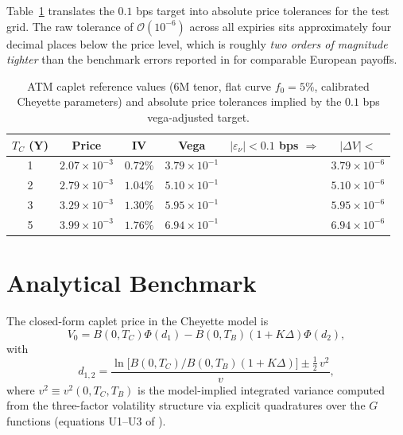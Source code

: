 \documentclass[11pt,a4paper]{article}
\begin{document}
Table~\ref{tab:budget} translates the $0.1$ bps target into absolute price
tolerances for the test grid. The raw tolerance of $\mathcal{O}(10^{-6})$
across all expiries sits approximately four decimal places below the price
level, which is roughly \emph{two orders of magnitude tighter} than the
benchmark errors reported in \cite{HJE2018} for comparable European payoffs.

\begin{table}[h]
\centering
\begin{tabular}{cccccc}
\toprule
$T_C$ (Y) & Price & IV & Vega & $|\varepsilon_\nu| < 0.1$ bps $\Rightarrow$ & $|\Delta V| <$ \\
\midrule
1 & $2.07 \times 10^{-3}$ & $0.72\%$ & $3.79 \times 10^{-1}$ & & $3.79 \times 10^{-6}$ \\
2 & $2.79 \times 10^{-3}$ & $1.04\%$ & $5.10 \times 10^{-1}$ & & $5.10 \times 10^{-6}$ \\
3 & $3.29 \times 10^{-3}$ & $1.30\%$ & $5.95 \times 10^{-1}$ & & $5.95 \times 10^{-6}$ \\
5 & $3.99 \times 10^{-3}$ & $1.76\%$ & $6.94 \times 10^{-1}$ & & $6.94 \times 10^{-6}$ \\
\bottomrule
\end{tabular}
\caption{ATM caplet reference values (6M tenor, flat curve $f_0 = 5\%$,
calibrated Cheyette parameters) and absolute price tolerances implied by the
$0.1$ bps vega-adjusted target.}
\label{tab:budget}
\end{table}

\section{Analytical Benchmark}
\label{sec:analytical}

The closed-form caplet price in the Cheyette model \cite{BCK2012} is
\begin{equation}
  V_0 = B(0, T_C)\Phi(d_1) - B(0, T_B)(1 + K\Delta)\Phi(d_2),
  \label{eq:analytical}
\end{equation}
with
\begin{equation}
  d_{1,2} = \frac{\ln\!\bigl[B(0,T_C) / B(0,T_B)(1+K\Delta)\bigr]
                  \pm \tfrac{1}{2}\,v^2}{v},
\end{equation}
where $v^2 \equiv v^2(0, T_C, T_B)$ is the model-implied integrated variance
computed from the three-factor volatility structure via explicit quadratures
over the $G$ functions (equations U1--U3 of \cite{BCK2012}).
\end{document}
